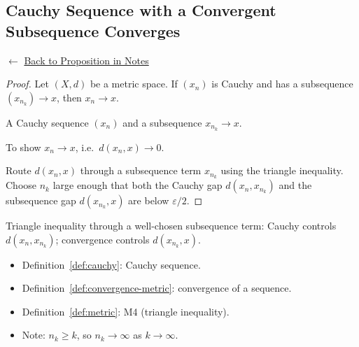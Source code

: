 
\subsection*{Cauchy Sequence with a Convergent Subsequence Converges}
\label{prf:cauchy-subsequence-converges}

\begin{remark*}[Return]
$\leftarrow$ \hyperref[prop:cauchy-subsequence]{Back to Proposition in Notes}
\end{remark*}

\begin{proof}
\Claim Let $(X,d)$ be a metric space.
If $(x_n)$ is Cauchy and has a subsequence $(x_{n_k}) \to x$,
then $x_n \to x$.

\Given A Cauchy sequence $(x_n)$ and a subsequence $x_{n_k} \to x$.

\Goal To show $x_n \to x$, i.e.\ $d(x_n, x) \to 0$.

\Strategy Route $d(x_n, x)$ through a subsequence term $x_{n_k}$
using the triangle inequality. Choose $n_k$ large enough that
both the Cauchy gap $d(x_n, x_{n_k})$ and the subsequence gap
$d(x_{n_k}, x)$ are below $\varepsilon/2$.


\end{proof}

\begin{remark*}
Triangle inequality through a well-chosen subsequence term:
Cauchy controls $d(x_n, x_{n_k})$; convergence controls $d(x_{n_k}, x)$.
\end{remark*}

\begin{remark*}[Dependencies]
\begin{itemize}
  \item Definition~\ref{def:cauchy}: Cauchy sequence.
  \item Definition~\ref{def:convergence-metric}: convergence of a sequence.
  \item Definition~\ref{def:metric}: M4 (triangle inequality).
  \item Note: $n_k \ge k$, so $n_k \to \infty$ as $k \to \infty$.
\end{itemize}
\end{remark*}
